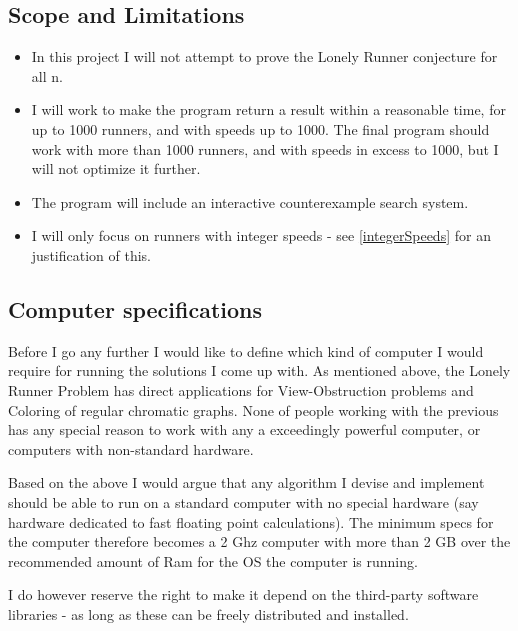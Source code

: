 \subsection{Scope and Limitations}
\label{scope}
\begin{itemize}
\item In this project I will not attempt to prove the Lonely Runner conjecture for all n. 
\item I will work to make the program return a result within a reasonable time, for up to 1000 runners, and with speeds up to 1000. The final program should work with more than 1000 runners, and with speeds in excess to 1000, but I will not optimize it further. 
\item The program will include an interactive counterexample search system.
\item I will only focus on runners with integer speeds - see \ref{integerSpeeds} for an justification of this.
\end{itemize}

\subsection{Computer specifications}
\label{specs}
Before I go any further I would like to define which kind of computer I would require for running the solutions I come up with. As mentioned above, the Lonely Runner Problem has direct applications for View-Obstruction problems and Coloring of regular chromatic graphs. None of people working with the previous has any special reason to work with any a exceedingly powerful computer, or computers with non-standard hardware.
 
Based on the above I would argue that any algorithm I devise and implement should be able to run on a standard computer with no special hardware (say hardware dedicated to fast floating point calculations). The minimum specs for the computer therefore becomes a 2 Ghz computer with more than 2 GB over the recommended amount of Ram for the OS the computer is running. 

I do however reserve the right to make it depend on the third-party software libraries - as long as these can be freely distributed and installed.

